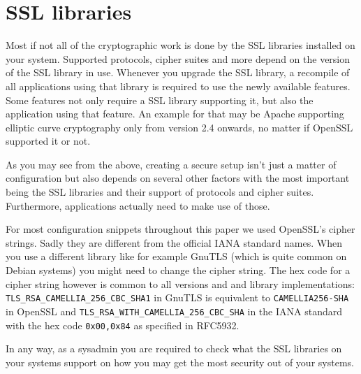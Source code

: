 \section{SSL libraries}
\label{section:ssllibs}


Most if not all of the cryptographic work is done by the SSL libraries installed on
your system. Supported protocols, cipher suites and more depend on the version of
the SSL library in use. Whenever you upgrade the SSL library, a recompile of all
applications using that library is required to use the newly available features.
Some features not only require a SSL library supporting it, but also the application
using that feature. An example for that may be Apache supporting elliptic curve
cryptography only from version 2.4 onwards, no matter if OpenSSL supported it or
not.

As you may see from the above, creating a secure setup isn't just a matter of
configuration but also depends on several other factors with the most important
being the SSL libraries and their support of protocols and cipher suites.
Furthermore, applications actually need to make use of those.

For most configuration snippets throughout this paper we used OpenSSL's cipher
strings. Sadly they are different from the official IANA standard names. When you
use a different library like for example GnuTLS (which is quite common on Debian
systems) you might need to change the cipher string. The hex code for a cipher
string however is common to all versions and and library implementations:
\texttt{TLS\_RSA\_CAMELLIA\_256\_CBC\_SHA1} in GnuTLS is equivalent to
\texttt{CAMELLIA256-SHA} in OpenSSL and \texttt{TLS\_RSA\_WITH\_CAMELLIA\_256\_CBC\_SHA}
in the IANA standard with the hex code \texttt{0x00,0x84} as specified in RFC5932.

In any way, as a sysadmin you are required to check what the SSL libraries on
your systems support on how you may get the most security out of your systems.




